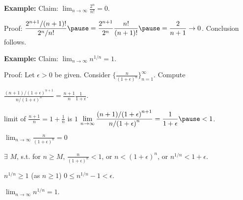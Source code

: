 \documentclass[10pt,aspectratio=169]{beamer}
\begin{document}
\begin{frame}

\textbf{Example:}
Claim:
$\displaystyle
\lim_{n\to\infty} \frac{2^n}{n!} = 0$.

\pause
\medskip

Proof:
\quad
$\displaystyle
\frac{2^{n+1} / (n+1)!}{2^n/n!}
\pause
=
\frac{2^{n+1}}{2^n}\frac{n!}{(n+1)!}
\pause
=
\frac{2}{n+1} \to 0$.
\pause
\quad Conclusion follows.

\pause
\medskip

\textbf{Example:}
Claim:
$\displaystyle
\lim_{n\to\infty} n^{1/n} = 1$.

\pause
Proof:
Let $\epsilon > 0$ be given. 
\pause
Consider
$\bigl\{ \frac{n}{{(1+\epsilon)}^n} \bigr\}_{n=1}^\infty$.
\pause
Compute

\quad
$\displaystyle
\frac{(n+1)/{(1+\epsilon)}^{n+1}}{n/{(1+\epsilon)}^{n}}
=
\frac{n+1}{n} \frac{1}{1+\epsilon} .
$

\pause
\medskip

limit of $\frac{n+1}{n} = 1+\frac{1}{n}$ is $1$
\pause
\wthus
$\displaystyle
\lim_{n\to \infty} \frac{(n+1)/{(1+\epsilon)}^{n+1}}{n/{(1+\epsilon)}^{n}}
=
\frac{1}{1+\epsilon}  \pause < 1$.

\pause
\medskip

\thus 
\quad
$\displaystyle \lim_{n\to\infty} \frac{n}{{(1+\epsilon)}^n} = 0$

\pause
\thus \quad
$\exists$ $M$, s.t. for $n \geq M$,
$\frac{n}{{(1+\epsilon)}^n} < 1$,
\pause
\quad or \quad
$n < {(1+\epsilon)}^n$,
\pause
\quad or \quad
$n^{1/n} < 1+\epsilon$.

\pause
\medskip

$n^{1/n} \geq 1$ (as $n \geq 1$)
\pause
\wthus
$0 \leq n^{1/n}-1 < \epsilon$.

\pause
\medskip

\thus \quad
$\displaystyle \lim_{n\to\infty} n^{1/n} = 1$.

\end{frame}

%
%
%
%
\end{document}
